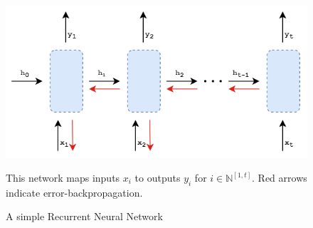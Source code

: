 \documentclass{report}
\begin{document}
	\begin{figure}[h]
		\centering
		\includegraphics[width=12cm]{rnn}
		\caption{A simple Recurrent Neural Network}
		\label{fig:rnn:1}
		This network maps inputs $x_i$ to outputs $y_i$ for $i \in \mathbb{N}^{[1, t]}$. Red arrows indicate error-backpropagation.
	\end{figure}
	
\end{document}
